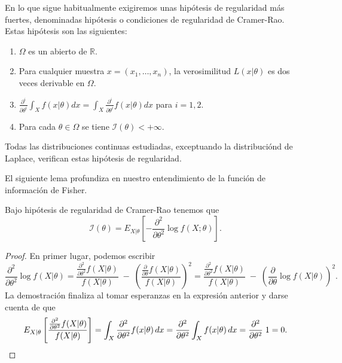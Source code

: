 \documentclass{article}
\begin{document}
    En lo que sigue habitualmente exigiremos unas hipótesis de regularidad más fuertes, denominadas hipótesis o condiciones de regularidad de Cramer-Rao. Estas hipótesis son las siguientes:

    \begin{enumerate}[label=\roman*)]
        \item $\Omega$ es un abierto de $\mathbb{R}$.
        \item Para cualquier muestra $x = (x_1, \ldots, x_n)$, la verosimilitud $L(x | \theta)$ es dos veces derivable en $\Omega$.
        \item $\frac{\partial^i}{\partial\theta^i} \int_X f(x | \theta) dx = \int_X \frac{\partial^i}{\partial\theta^i} f(x | \theta) dx$ para $i=1,2$.
        \item Para cada $\theta \in \Omega$ se tiene $\mathcal{I}(\theta) < +\infty$.
    \end{enumerate}

    Todas las distribuciones continuas estudiadas, exceptuando la distribuciónd de Laplace, verifican estas hipótesis de regularidad.

    El siguiente lema profundiza en nuestro entendimiento de la función de información de Fisher.

    \begin{lem} \label{lem:fisher:2dev}
        Bajo hipótesis de regularidad de Cramer-Rao tenemos que
        \[\mathcal{I}(\theta) = E_{X|\theta} \left[-\frac{\partial^2}{\partial\theta^2} \log f(X;\theta) \right].\]
    \end{lem}
    \begin{proof}
        En primer lugar, podemos escribir
        \[\frac{\partial^2}{\partial\theta^2} \log f(X|\theta)=\frac{\frac{\partial^2}{\partial\theta^2} f(X|\theta)}{f(X| \theta)}\;-\;\left( \frac{\frac{\partial}{\partial\theta} f(X|\theta)}{f(X| \theta)} \right)^2=\frac{\frac{\partial^2}{\partial\theta^2} f(X|\theta)}{f(X| \theta)}\;-\;\left( \frac{\partial}{\partial\theta} \log f(X|\theta)\right)^2.\]
        La demostración finaliza al tomar esperanzas en la expresión anterior y darse cuenta de que
        \[E_{X|\theta}\left[\frac{\frac{\partial^2}{\partial\theta^2} f(X|\theta)}{f(X| \theta)}\right] = \int_X \frac{\partial^2}{\partial\theta^2} f(x | \theta)\, dx = \frac{\partial^2}{\partial\theta^2} \int_X f(x | \theta)\, dx = \frac{\partial^2}{\partial\theta^2} \; 1 = 0. \qedhere\]
    \end{proof}
\end{document}
